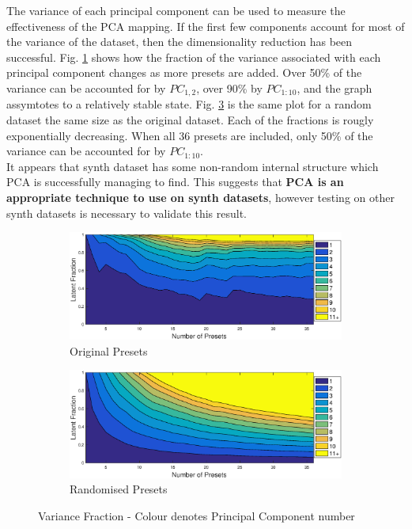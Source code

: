 \documentclass[11pt, oneside]{report}   	%
\begin{document}
The variance of each principal component can be used to measure the effectiveness of the PCA mapping. If the first few components account for most of the variance of the dataset, then the dimensionality reduction has been successful.
Fig. \ref{fig:LatentOriginal} shows how the fraction of the variance associated with each principal component changes as more presets are added. Over 50\% of the variance can be accounted for by $PC_{1,2}$,  over 90\% by $PC_{1 : 10}$, and the graph assymtotes to a relatively stable state. Fig. \ref{fig:LatentRandom} is the same plot for a random dataset the same size as the original dataset. Each of the fractions is rougly exponentially decreasing. When all 36 presets are included, only 50\% of the variance can be accounted for by $PC_{1 : 10}$. \\
It appears that synth dataset has some non-random internal structure which PCA is successfully managing to find. This suggests that \textbf{PCA is an appropriate technique to use on synth datasets}, however testing on other synth datasets is necessary to validate this result.
\begin{figure}[h]
	\vspace{-5pt}
	\hspace{-40pt}
	\begin{subfigure}{3.5in}
		\includegraphics[trim = {0, 0.1cm, 0, 0.5cm}, clip, width = \textwidth]{LatentFraction.eps}
		\caption{Original Presets}
		\label{fig:LatentOriginal}
	\end{subfigure} 
%
	\begin{subfigure}{3.5in}
		\includegraphics[trim = {0, 0.1cm, 0, 0.5cm}, clip, width = \textwidth]{LatentFractionRandom.eps}
		\caption{Randomised Presets}
		\label{fig:LatentRandom}
	\end{subfigure}
	\caption{Variance Fraction - Colour denotes Principal Component number}
\end{figure}
\end{document}
